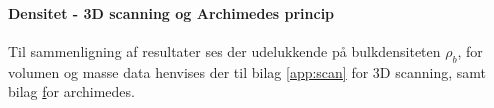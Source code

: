 % 



%
%  
%


%
%  

%  
%
\paragraph{Densitet - 3D scanning og Archimedes princip}
Til sammenligning af resultater ses der udelukkende på bulkdensiteten $\rho_b$, for volumen og masse data henvises der til bilag \vref{app:scan} for 3D scanning, samt bilag \href{app:arki_calc} for archimedes.  

